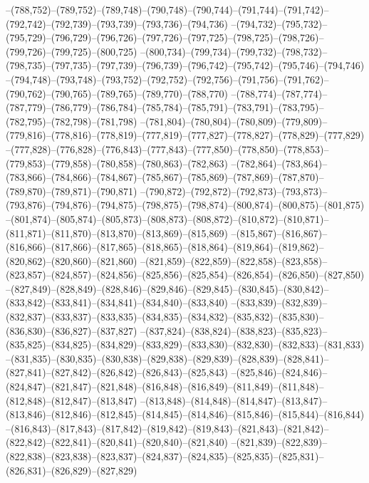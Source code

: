 --(788,752)--(789,752)--(789,748)--(790,748)--(790,744)--(791,744)--(791,742)--(792,742)--(792,739)--(793,739)--(793,736)--(794,736)
--(794,732)--(795,732)--(795,729)--(796,729)--(796,726)--(797,726)--(797,725)--(798,725)--(798,726)--(799,726)--(799,725)--(800,725)
--(800,734)--(799,734)--(799,732)--(798,732)--(798,735)--(797,735)--(797,739)--(796,739)--(796,742)--(795,742)--(795,746)--(794,746)
--(794,748)--(793,748)--(793,752)--(792,752)--(792,756)--(791,756)--(791,762)--(790,762)--(790,765)--(789,765)--(789,770)--(788,770)
--(788,774)--(787,774)--(787,779)--(786,779)--(786,784)--(785,784)--(785,791)--(783,791)--(783,795)--(782,795)--(782,798)--(781,798)
--(781,804)--(780,804)--(780,809)--(779,809)--(779,816)--(778,816)--(778,819)--(777,819)--(777,827)--(778,827)--(778,829)--(777,829)
--(777,828)--(776,828)--(776,843)--(777,843)--(777,850)--(778,850)--(778,853)--(779,853)--(779,858)--(780,858)--(780,863)--(782,863)
--(782,864)--(783,864)--(783,866)--(784,866)--(784,867)--(785,867)--(785,869)--(787,869)--(787,870)--(789,870)--(789,871)--(790,871)
--(790,872)--(792,872)--(792,873)--(793,873)--(793,876)--(794,876)--(794,875)--(798,875)--(798,874)--(800,874)--(800,875)--(801,875)
--(801,874)--(805,874)--(805,873)--(808,873)--(808,872)--(810,872)--(810,871)--(811,871)--(811,870)--(813,870)--(813,869)--(815,869)
--(815,867)--(816,867)--(816,866)--(817,866)--(817,865)--(818,865)--(818,864)--(819,864)--(819,862)--(820,862)--(820,860)--(821,860)
--(821,859)--(822,859)--(822,858)--(823,858)--(823,857)--(824,857)--(824,856)--(825,856)--(825,854)--(826,854)--(826,850)--(827,850)
--(827,849)--(828,849)--(828,846)--(829,846)--(829,845)--(830,845)--(830,842)--(833,842)--(833,841)--(834,841)--(834,840)--(833,840)
--(833,839)--(832,839)--(832,837)--(833,837)--(833,835)--(834,835)--(834,832)--(835,832)--(835,830)--(836,830)--(836,827)--(837,827)
--(837,824)--(838,824)--(838,823)--(835,823)--(835,825)--(834,825)--(834,829)--(833,829)--(833,830)--(832,830)--(832,833)--(831,833)
--(831,835)--(830,835)--(830,838)--(829,838)--(829,839)--(828,839)--(828,841)--(827,841)--(827,842)--(826,842)--(826,843)--(825,843)
--(825,846)--(824,846)--(824,847)--(821,847)--(821,848)--(816,848)--(816,849)--(811,849)--(811,848)--(812,848)--(812,847)--(813,847)
--(813,848)--(814,848)--(814,847)--(813,847)--(813,846)--(812,846)--(812,845)--(814,845)--(814,846)--(815,846)--(815,844)--(816,844)
--(816,843)--(817,843)--(817,842)--(819,842)--(819,843)--(821,843)--(821,842)--(822,842)--(822,841)--(820,841)--(820,840)--(821,840)
--(821,839)--(822,839)--(822,838)--(823,838)--(823,837)--(824,837)--(824,835)--(825,835)--(825,831)--(826,831)--(826,829)--(827,829)
